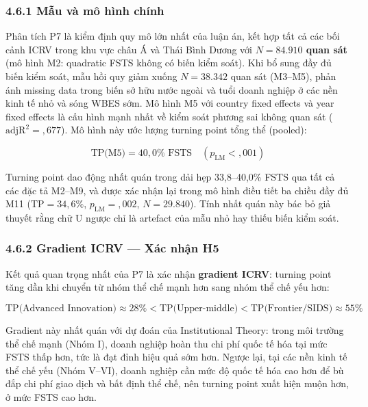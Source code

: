 \documentclass[12pt,a4paper]{article}
\begin{document}
\hypertarget{461-mux1eabu-vuxe0-muxf4-huxecnh-chuxednh}{%
\subsubsection{4.6.1 Mẫu và mô hình
chính}\label{461-mux1eabu-vuxe0-muxf4-huxecnh-chuxednh}}

Phân tích P7 là kiểm định quy mô lớn nhất của luận án, kết hợp tất cả
các bối cảnh ICRV trong khu vực châu Á và Thái Bình Dương với
\textbf{\(N = 84.910\) quan sát} (mô hình M2: quadratic FSTS không có
biến kiểm soát). Khi bổ sung đầy đủ biến kiểm soát, mẫu hồi quy giảm
xuống \(N = 38.342\) quan sát (M3--M5), phản ánh missing data trong biến
sở hữu nước ngoài và tuổi doanh nghiệp ở các nền kinh tế nhỏ và sóng
WBES sớm. Mô hình M5 với country fixed effects và year fixed effects là
cấu hình mạnh nhất về kiểm soát phương sai không quan sát
(\(\text{adjR}^2 = {,}677\)). Mô hình này ước lượng turning point tổng
thể (pooled):

\[\text{TP(M5)} = 40{,}0\% \text{ FSTS} \quad (p_{\text{LM}} < {,}001)\]

Turning point dao động nhất quán trong dải hẹp 33,8--40,0\% FSTS qua tất
cả các đặc tả M2--M9, và được xác nhận lại trong mô hình điều tiết ba
chiều đầy đủ M11 (\(\text{TP} = 34{,}6\%\), \(p_{\text{LM}} = {,}002\),
\(N = 29.840\)). Tính nhất quán này bác bỏ giả thuyết rằng chữ U ngược
chỉ là artefact của mẫu nhỏ hay thiếu biến kiểm soát.

\hypertarget{462-gradient-icrv--xuxe1c-nhux1eadn-h5}{%
\subsubsection{4.6.2 Gradient ICRV --- Xác nhận
H5}\label{462-gradient-icrv--xuxe1c-nhux1eadn-h5}}

Kết quả quan trọng nhất của P7 là xác nhận \textbf{gradient ICRV}:
turning point tăng dần khi chuyển từ nhóm thể chế mạnh hơn sang nhóm thể
chế yếu hơn:

\[\text{TP(Advanced Innovation)} \approx 28\% < \text{TP(Upper-middle)} < \text{TP(Frontier/SIDS)} \approx 55\%\]

Gradient này nhất quán với dự đoán của Institutional Theory: trong môi
trường thể chế mạnh (Nhóm I), doanh nghiệp hoàn thu chi phí quốc tế hóa
tại mức FSTS thấp hơn, tức là đạt đỉnh hiệu quả sớm hơn. Ngược lại, tại
các nền kinh tế thể chế yếu (Nhóm V--VI), doanh nghiệp cần mức độ quốc
tế hóa cao hơn để bù đắp chi phí giao dịch và bất định thể chế, nên
turning point xuất hiện muộn hơn, ở mức FSTS cao hơn.
\end{document}
